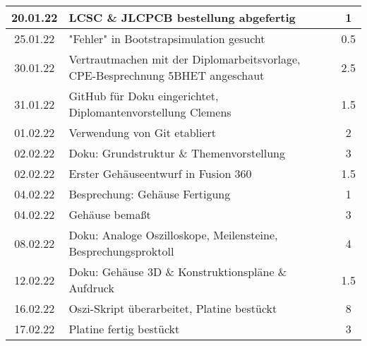 \begin{longtable}{c|p{10cm}|c}
    20.01.22       & LCSC \& JLCPCB bestellung abgefertig                                                                          & 1                \\ \hline
    25.01.22       & "Fehler" in Bootstrapsimulation gesucht                                                                       & 0.5              \\ \hline
    30.01.22       & Vertrautmachen mit der Diplomarbeitsvorlage, \newline CPE-Besprechnung   5BHET angeschaut                     & 2.5              \\ \hline
    31.01.22       & GitHub für Doku eingerichtet, \newline Diplomantenvorstellung Clemens                                         & 1.5              \\ \hline
    01.02.22       & Verwendung von Git etabliert                                                                                  & 2                \\ \hline
    02.02.22       & Doku: Grundstruktur \& Themenvorstellung                                                                      & 3                \\ \hline
    02.02.22       & Erster Gehäuseentwurf in Fusion 360                                                                           & 1.5              \\ \hline
    04.02.22       & Besprechung: Gehäuse Fertigung                                                                                & 1                \\ \hline
    04.02.22       & Gehäuse bemaßt                                                                                                & 3                \\ \hline
    08.02.22       & Doku: Analoge Oszilloskope, \newline Meilensteine, Besprechungsproktoll                                       & 4                \\ \hline
    12.02.22       & Doku: Gehäuse 3D \& Konstruktionspläne \& Aufdruck                                                            & 1.5              \\ \hline
    16.02.22       & Oszi-Skript überarbeitet, Platine bestückt                                                                    & 8                \\ \hline
    17.02.22       & Platine fertig bestückt                                                                                       & 3                \\ \hline

\end{longtable}
